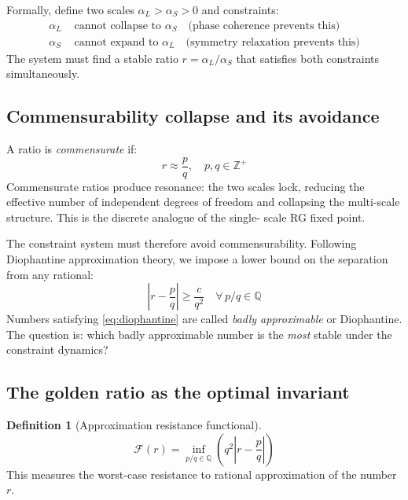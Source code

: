 \documentclass[11pt,a4paper]{article}
\theoremstyle{plain}
\theoremstyle{definition}
\newtheorem{definition}[theorem]{Definition}
\begin{document}
Formally, define two scales $\alpha_L > \alpha_S > 0$ and constraints:
\begin{align}
\alpha_L &\text{ cannot collapse to } \alpha_S
  \quad \text{(phase coherence prevents this)}\label{eq:c1}\\
\alpha_S &\text{ cannot expand to } \alpha_L
  \quad \text{(symmetry relaxation prevents this)}\label{eq:c2}
\end{align}
The system must find a stable ratio $r = \alpha_L / \alpha_S$ that
satisfies both constraints simultaneously.

\subsection{Commensurability collapse and its avoidance}

A ratio is \emph{commensurate} if:
\begin{equation}
r \approx \frac{p}{q}, \quad p, q \in \mathbb{Z}^+
\end{equation}
Commensurate ratios produce resonance: the two scales lock, reducing
the effective number of independent degrees of freedom and collapsing
the multi-scale structure. This is the discrete analogue of the single-
scale RG fixed point.

The constraint system must therefore avoid commensurability. Following
Diophantine approximation theory, we impose a lower bound on the
separation from any rational:
\begin{equation}
\label{eq:diophantine}
\left| r - \frac{p}{q} \right| \geq \frac{c}{q^2}
  \quad \forall\, p/q \in \mathbb{Q}
\end{equation}
Numbers satisfying \eqref{eq:diophantine} are called \emph{badly
approximable} or Diophantine. The question is: which badly approximable
number is the \emph{most} stable under the constraint dynamics?

\subsection{The golden ratio as the optimal invariant}

\begin{definition}[Approximation resistance functional]
\begin{equation}
\mathcal{F}(r) = \inf_{p/q \in \mathbb{Q}}
  \left( q^2 \left| r - \frac{p}{q} \right| \right)
\end{equation}
This measures the worst-case resistance to rational approximation of
the number $r$.
\end{definition}
\end{document}
